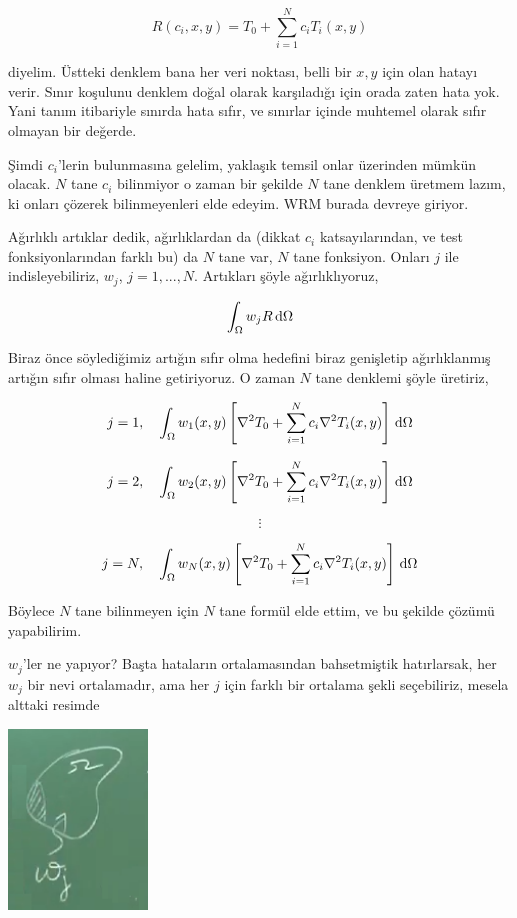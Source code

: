 \documentclass[12pt,fleqn]{article}\usepackage{../../common}
\begin{document}
$$
R(c_i,x,y) = T_0 + \sum_{i=1}^{N} c_i T_i(x,y)
$$

diyelim. Üstteki denklem bana her veri noktası, belli bir $x,y$ için olan hatayı
verir. Sınır koşulunu denklem doğal olarak karşıladığı için orada zaten hata
yok. Yani tanım itibariyle sınırda hata sıfır, ve sınırlar içinde muhtemel
olarak sıfır olmayan bir değerde.

Şimdi $c_i$'lerin bulunmasına gelelim, yaklaşık temsil onlar üzerinden mümkün
olacak. $N$ tane $c_i$ bilinmiyor o zaman bir şekilde $N$ tane denklem üretmem
lazım, ki onları çözerek bilinmeyenleri elde edeyim. WRM burada devreye giriyor.

Ağırlıklı artıklar dedik, ağırlıklardan da (dikkat $c_i$ katsayılarından, ve
test fonksiyonlarından farklı bu) da $N$ tane var, $N$ tane fonksiyon. Onları
$j$ ile indisleyebiliriz, $w_j$, $j=1,...,N$. Artıkları şöyle ağırlıklıyoruz,

$$
\int_\Omega w_j R \,\mathrm{d} \Omega
$$

Biraz önce söylediğimiz artığın sıfır olma hedefini biraz genişletip
ağırlıklanmış artığın sıfır olması haline getiriyoruz. O zaman $N$ tane denklemi
şöyle üretiriz,

$$
j=1,\quad
\int_\Omega w_1 (x,y) \left[
  \nabla^2 T_0 + \sum_{i=1}^{N} c_i \nabla^2 T_i(x,y) 
  \right] \,\mathrm{d} \Omega
$$

$$
j=2,\quad
\int_\Omega w_2 (x,y) \left[
  \nabla^2 T_0 + \sum_{i=1}^{N} c_i \nabla^2 T_i(x,y) 
  \right] \,\mathrm{d} \Omega
$$

$$
\vdots
$$

$$
j=N,\quad
\int_\Omega w_N (x,y) \left[
  \nabla^2 T_0 + \sum_{i=1}^{N} c_i \nabla^2 T_i(x,y) 
  \right] \,\mathrm{d} \Omega
$$

Böylece $N$ tane bilinmeyen için $N$ tane formül elde ettim, ve bu şekilde
çözümü yapabilirim.

$w_j$'ler ne yapıyor? Başta hataların ortalamasından bahsetmiştik hatırlarsak,
her $w_j$ bir nevi ortalamadır, ama her $j$ için farklı bir ortalama şekli
seçebiliriz, mesela alttaki resimde

\includegraphics[width=10em]{compscieng_app45aerofem1_02.png}
\end{document}
